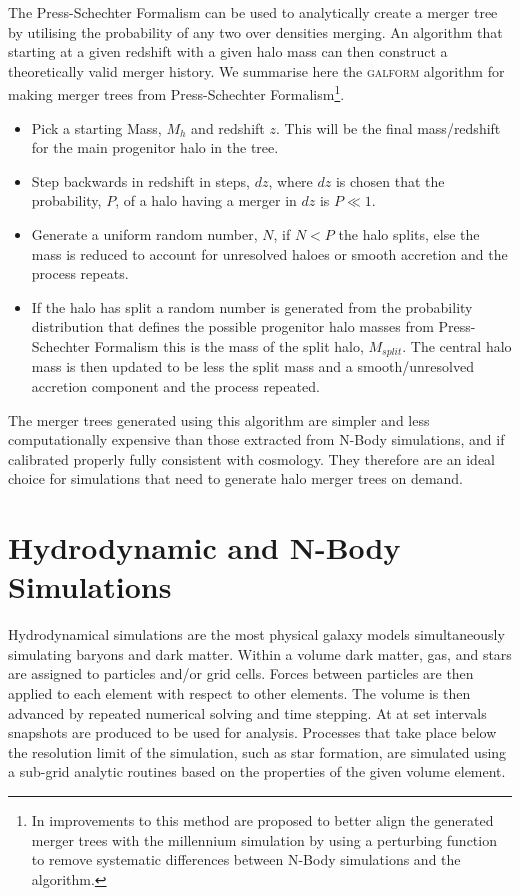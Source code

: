 The Press-Schechter Formalism can be used to analytically create a merger tree by utilising the probability of any two over densities merging. An algorithm that starting at a given redshift with a given halo mass can then construct a theoretically valid merger history. We summarise here the \textsc{galform} \citep{Cole2000} algorithm for making merger trees from Press-Schechter Formalism\footnote{In \citet{Parkinson2008GeneratingTrees} improvements to this method are proposed to better align the generated merger trees with the millennium simulation by using a perturbing function to remove systematic differences between N-Body simulations and the algorithm.}.

\begin{itemize}
    \item Pick a starting Mass, $M_{h}$ and redshift $z$. This will be the final mass/redshift for the main progenitor halo in the tree.
    \item Step backwards in redshift in steps, $dz$, where $dz$ is chosen that the probability, $P$, of a halo having a merger in $dz$ is $P\ll1$.
    \item Generate a uniform random number, $N$, if $N<P$ the halo splits, else the mass is reduced to account for unresolved haloes or smooth accretion and the process repeats.
    \item If the halo has split a random number is generated from the probability distribution that defines the possible progenitor halo masses from  Press-Schechter Formalism this is the mass of the split halo, $M_{split}$. The central halo mass is then updated to be less the split mass and a smooth/unresolved accretion component and the process repeated.
\end{itemize}

The merger trees generated using this algorithm are simpler and less computationally expensive than those extracted from N-Body simulations, and if calibrated properly fully consistent with \LCDM cosmology. They therefore are an ideal choice for simulations that need to generate halo merger trees on demand.

\section{Hydrodynamic and N-Body Simulations}
\label{sec:Hydro}
Hydrodynamical simulations are the most physical galaxy models simultaneously simulating baryons and dark matter. Within a volume dark matter, gas, and stars are assigned to particles and/or grid cells. Forces between particles are then applied to each element with respect to other elements. The volume is then advanced by repeated numerical solving and time stepping. At at set intervals snapshots are produced to be used for analysis. Processes that take place below the resolution limit of the simulation, such as star formation, are simulated using a sub-grid analytic routines based on the properties of the given volume element.

